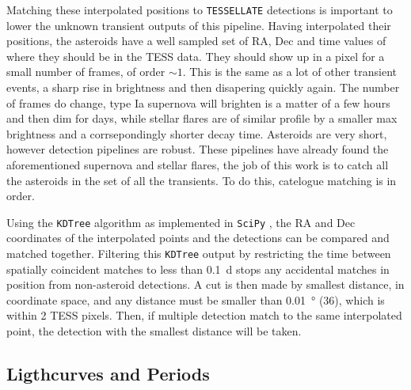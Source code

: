 \documentclass[12pt]{article}
\begin{document}
Matching these interpolated positions to \texttt{TESSELLATE} detections is important to lower the unknown transient outputs of this pipeline. 
Having interpolated their positions, the asteroids have a well sampled set of RA, Dec and time values of where they should be in the TESS data.
They should show up in a pixel for a small number of frames, of order $\sim1$.
This is the same as a lot of other transient events, a sharp rise in brightness and then disapering quickly again.
The number of frames do change, type Ia supernova will brighten is a matter of a few hours and then dim for days, while stellar flares are of similar profile by a smaller max brightness and a corrsepondingly shorter decay time.
Asteroids are very short, however detection pipelines are robust.
These pipelines have already found the aforementioned supernova and stellar flares, the job of this work is to catch all the asteroids in the set of all the transients.
To do this, catelogue matching is in order.

Using the \texttt{KDTree} algorithm \citep{Maneewongvatana1999} as implemented in \texttt{SciPy} \citep{2020SciPy-NMeth}, the RA and Dec coordinates of the interpolated points and the detections can be compared and matched together. 
Filtering this \texttt{KDTree} output by restricting the time between spatially coincident matches to less than \qty{0.1}{\day} stops any accidental matches in position from non-asteroid detections. 
A cut is then made by smallest distance, in coordinate space, and any distance must be smaller than \qty{0.01}{\degree} (\qty{36}{\arcsec}), which is within 2 TESS pixels. 
Then, if multiple detection match to the same interpolated point, the detection with the smallest distance will be taken.




\subsection{Ligthcurves and Periods}\label{SubSec:LCsandPs}
\end{document}
